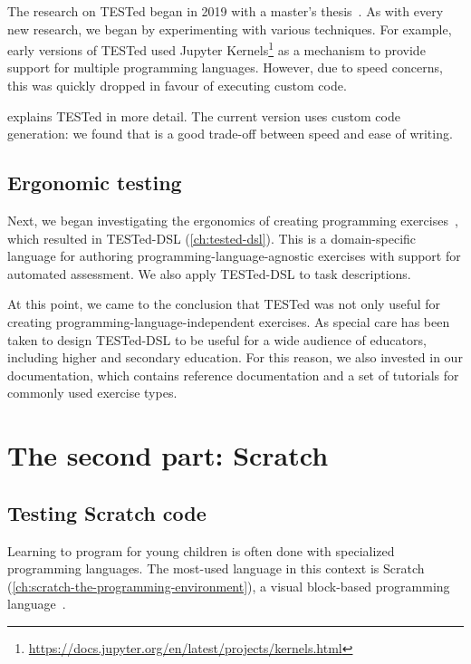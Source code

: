 \documentclass[./main]{subfiles}
\begin{document}
The research on TESTed began in 2019 with a master's thesis~\autocite{strijbolTESTedOneJudge2020}.
As with every new research, we began by experimenting with various techniques.
For example, early versions of TESTed used Jupyter Kernels\footnote{\url{https://docs.jupyter.org/en/latest/projects/kernels.html}} as a mechanism to provide support for multiple programming languages.
However, due to speed concerns, this was quickly dropped in favour of executing custom code.

 explains TESTed in more detail.
The current version uses custom code generation: we found that is a good trade-off between speed and ease of writing.

\subsection{Ergonomic testing}\label{subsec:ergonomic-testing}

Next, we began investigating the ergonomics of creating programming exercises~\autocite{selsTESTedProgrammeertaalonafhankelijkTesten2021}, which resulted in TESTed-DSL (\cref{ch:tested-dsl}).
This is a domain-specific language for authoring programming-language-agnostic exercises with support for automated assessment.
We also apply TESTed-DSL to task descriptions.

At this point, we came to the conclusion that TESTed was not only useful for creating programming-language-independent exercises.
As special care has been taken to design TESTed-DSL to be useful for a wide audience of educators, including higher and secondary education.
For this reason, we also invested in our documentation, which contains reference documentation and a set of tutorials for commonly used exercise types.

\section{The second part: Scratch}\label{sec:the-second-part:-scratch}

\subsection{Testing Scratch code}\label{subsec:testing-scrath-code}

Learning to program for young children is often done with specialized programming languages.
The most-used language in this context is Scratch (\cref{ch:scratch-the-programming-environment}), a visual block-based programming language~\autocite{resnickScratchProgrammingAll2009}.
\end{document}
